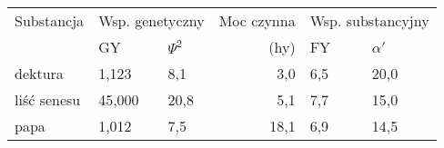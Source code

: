 \documentclass[a4paper]{article}
\begin{document}
\begin{tabularx}{\textwidth}{|l|X|X|r|X|X|}\hline
Substancja & \multicolumn{2}{c|}{Wsp. genetyczny} & Moc czynna \hfill& \multicolumn{2}{c|}{Wsp. substancyjny}\\ 
 \cline{2-3} \cline{5-6}%
        &  GY & $\Psi^2$ &  (hy) & FY & $\alpha'$ \\ \hline
dektura      &  1,123 &  8,1 & 3,0 & 6,5  & 20,0 \\
liść senesu  & 45,000 & 20,8 & 5,1 & 7,7  & 15,0 \\
papa         &  1,012 &  7,5 & 18,1 & 6,9 & 14,5 \\  \hline
\end{tabularx}
\end{document}
